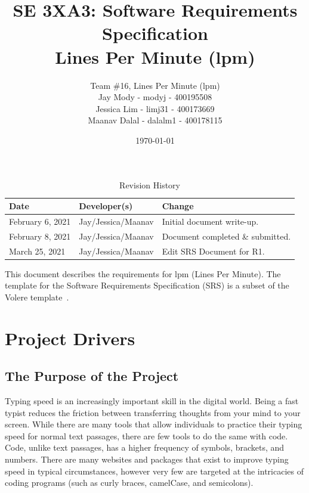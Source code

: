 \documentclass[12pt, titlepage]{article}
\title{\textbf{SE 3XA3: Software Requirements Specification}\\Lines Per Minute (lpm)}
\author{Team \#16, Lines Per Minute (lpm)\\
Jay Mody - modyj - 400195508\\
Jessica Lim - limj31 - 400173669\\
Maanav Dalal - dalalm1 - 400178115\\
}
\date{\today}
\begin{document}
\maketitle
\begin{table}[hp]
\caption{Revision History} \label{TblRevisionHistory}
\begin{tabularx}{\textwidth}{llX}
\toprule
\textbf{Date} & \textbf{Developer(s)} & \textbf{Change}\\
\midrule
February 6, 2021 & Jay/Jessica/Maanav & Initial document write-up. \\
February 8, 2021 & Jay/Jessica/Maanav & Document completed \& submitted. \\
March 25, 2021 & Jay/Jessica/Maanav & Edit SRS Document for R1. \\
\bottomrule
\end{tabularx}
\end{table}

\newpage

\tableofcontents
\listoftables
\listoffigures

\newpage


This document describes the requirements for lpm (Lines Per Minute).  The template for the Software
Requirements Specification (SRS) is a subset of the Volere
template~\citep{RobertsonAndRobertson2012}.
\section{Project Drivers}

\subsection{The Purpose of the Project}
Typing speed is an increasingly important skill in the digital world. Being a fast typist reduces the friction between transferring thoughts from your mind to your screen. While there are many tools that allow individuals to practice their typing speed for normal text passages, there are few tools to do the same with code. Code, unlike text passages, has a higher frequency of symbols, brackets, and numbers. There are many websites and packages that exist to improve typing speed in typical circumstances, however very few are targeted at the intricacies of coding programs (such as curly braces, camelCase, and semicolons). \\
\end{document}
